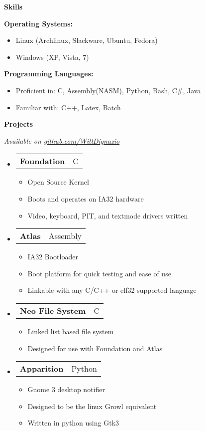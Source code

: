 \documentclass[letterpaper,11pt]{article}
\makeatletter
\newcommand{\resheading}[1]{{\large \colorbox{mygrey}{\begin{minipage}{\textwidth}{\textbf{#1 \vphantom{p\^{E}}}}\end{minipage}}}}
\newcommand{\restwosubheading}[2]{
\begin{tabular*}{6.5in}{l@{\extracolsep{\fill}}r}
		\textbf{#1} & #2 \\
\end{tabular*}\vspace{-6pt}}
\makeatother
\begin{document}
\resheading{{Skills}}
{ \footnotesize
	\begin{description}
		\item{\textbf{Operating Systems: }}
			\begin{itemize}
				\item{Linux (Archlinux, Slackware, Ubuntu, Fedora)}
				\item{Windows (XP, Vista, 7)}
			\end{itemize}
		\item{\textbf{Programming Languages: }}
			\begin{itemize}
				\item{Proficient in: }{C, Assembly(NASM), Python, Bash, C\#, Java}
				\item{Familiar with: }{C++, Latex, Batch}
			\end{itemize}
	\end{description}
}
\resheading{Projects}
{ \footnotesize
	\textit{Available on {\href{http://www.github.com/WillDignazio/}{github.com/WillDignazio}}}
	\begin{itemize}
		\item 
		\restwosubheading{Foundation}{C}
			\begin{itemize}
				\item{Open Source Kernel}
				\item{Boots and operates on IA32 hardware}
				\item{Video, keyboard, PIT, and textmode drivers written}
			\end{itemize}
		\item		
		\restwosubheading{Atlas}{Assembly}
			\begin{itemize}
				\item{IA32 Bootloader} 
				\item{Boot platform for quick testing and ease of use}
				\item{Linkable with any C/C++ or elf32 supported language}
			\end{itemize}
		\item
		\restwosubheading{Neo File System}{C}				
			\begin{itemize}
				\item{Linked list based file system}
				\item{Designed for use with Foundation and Atlas}
			\end{itemize}
		\item
		\restwosubheading{Apparition}{Python}
			\begin{itemize}
				\item{Gnome 3 desktop notifier}
				\item{Designed to be the linux Growl equivalent}
				\item{Written in python using Gtk3}
			\end{itemize}
	\end{itemize}
}

\end{document}
